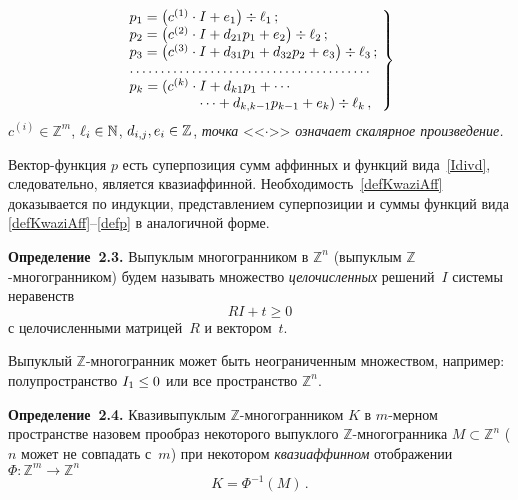 \begin{multicols}{2}
\noindent
\begin{equation}
\left.
\!\!\!\!\begin{array}{l}
 p_1 = \left(c^{(1)}\cdot I + e_1\right) \div \ell_1\,;\\
 p_2 = \left(c^{(2)}\cdot I + d_{21}p_1 + e_2\right) \div \ell_2\,;\\
 p_3 = \left(c^{(3)}\cdot I + d_{31}p_1 + d_{32}p_2 + e_3\right) \div \ell_3\,;\\
 \ldots \ldots \ldots \ldots \ldots \ldots \ldots \ldots \ldots \ldots\ldots\ldots\ldots\\
 p_k = (c^{(k)}\cdot I + d_{k1}p_1 + \cdots\\
 \hspace*{50pt}\cdots + d_{k,k-1}p_{k-1} + e_k) \div \ell_k\,,
\end{array}\!
\right\}\!\!
\label{defp}
\end{equation}
$c^{(i)}\in\mathbb{Z}^m$, $\ell_i\hm\in\mathbb{N}$, $d_{i,j},e_i\hm\in\mathbb{Z}$, 
\textit{точка} <<$\cdot$>> \textit{означает скалярное произведение.}

\smallskip

Вектор-функ\-ция $p$ есть суперпозиция сумм аффинных и функций
вида~\eqref{Idivd}, следовательно, является квазиаффинной.
Необходимость~\eqref{defKwaziAff} доказывается по индукции,
представлением суперпозиции и суммы функций вида
\eqref{defKwaziAff}--\eqref{defp} в аналогичной форме.

\smallskip

\noindent
\textbf{Определение~2.3.}
Выпуклым многогранником в $\mathbb{Z}^n$ (выпуклым
$\mathbb{Z}$-много\-гран\-ником) будем называть множество
\textit{целочисленных} решений~$I$ системы неравенств
\begin{equation}
RI+t\geq 0 \label{defVip}
\end{equation}
с целочисленными матрицей~$R$ и вектором~$t$.

\smallskip

Выпуклый $\mathbb{Z}$-многогранник может быть неограниченным
множеством, например: полупространство $I_1\hm\leq0$ или все
пространство $\mathbb{Z}^n$.

\smallskip

\noindent
\textbf{Определение~2.4.}
Квазивыпуклым $\mathbb{Z}$-мно\-го\-гран\-ни\-ком $K$ в $m$-мер\-ном
пространстве назовем прообраз некоторого выпуклого
$\mathbb{Z}$-мно\-го\-гран\-ни\-ка $M\subset\mathbb{Z}^n$ ($n$ может не
совпадать с~$m$) при некотором \textit{квазиаффинном} отображении
$\Phi:\mathbb{Z}^m\to\mathbb{Z}^n$
$$
K = \Phi^{-1}(M)\,.
$$



\end{multicols}
